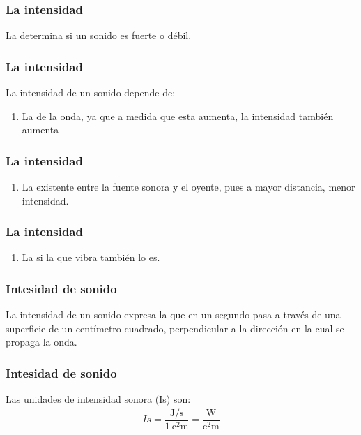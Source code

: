 \documentclass[14pt]{beamer}
\begin{document}
\begin{frame}
\frametitle{La intensidad}
La  determina si un sonido es fuerte o débil.
\end{frame}
\begin{frame}
\frametitle{La intensidad}
La intensidad de un sonido depende de:
\begin{enumerate}[<+->]
\item La  de la onda, ya que a medida que esta aumenta, la intensidad también aumenta
\seti
\end{enumerate}
\end{frame}
\begin{frame}
\frametitle{La intensidad}
\begin{enumerate}[<+->]    
\conti
\item La  existente entre la fuente sonora y el oyente, pues a mayor distancia, menor intensidad.
\seti
\end{enumerate}
\end{frame}
\begin{frame}
\frametitle{La intensidad}
\begin{enumerate}[<+->]    
\conti
\item La  \pause si la  que vibra también lo es.
\end{enumerate}
\end{frame}
\begin{frame}
\frametitle{Intesidad de sonido}
La intensidad de un sonido expresa la  que en un segundo pasa a través de una superficie de un centímetro cuadrado, perpendicular a la dirección en la cual se propaga la onda.
\end{frame}
\begin{frame}
\frametitle{Intesidad de sonido}
Las unidades de intensidad sonora (Is) son:
\pause
\begin{align*}
Is = \dfrac{\unit{\joule\per\second}}{\SI{1}{\square\centi\meter}} = \dfrac{\unit{\watt}}{\unit{\square\centi\meter}}
\end{align*}
\end{frame}
\end{document}

